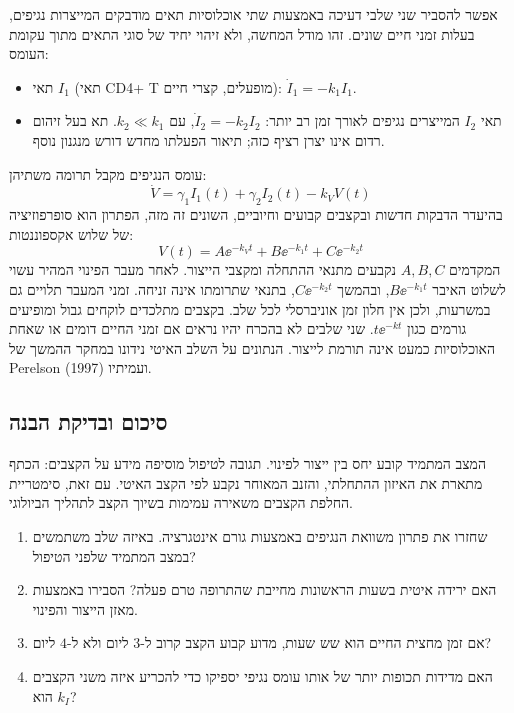 אפשר להסביר שני שלבי דעיכה באמצעות שתי אוכלוסיות תאים מודבקים המייצרות נגיפים, בעלות זמני חיים שונים. זהו מודל המחשה, ולא זיהוי יחיד של סוגי התאים מתוך עקומת העומס:
\begin{itemize}
\item תאי $I_1$ (תאי CD4+ T מופעלים, קצרי חיים): $\dot{I}_1 = -k_1 I_1$.
\item תאי $I_2$ המייצרים נגיפים לאורך זמן רב יותר: $\dot{I}_2 = -k_2 I_2$, עם $k_2 \ll k_1$. תא בעל זיהום רדום אינו יצרן רציף כזה; תיאור הפעלתו מחדש דורש מנגנון נוסף.
\end{itemize}
עומס הנגיפים מקבל תרומה משתיהן:
\begin{equation}\label{eq:biphasic-ode}
\dot{V} = \gamma_1 I_1(t) + \gamma_2 I_2(t) - k_V V(t)
\end{equation}
בהיעדר הדבקות חדשות ובקצבים קבועים וחיוביים, השונים זה מזה, הפתרון הוא סופרפוזיציה של שלוש אקספוננטות:
\begin{equation}\label{eq:biphasic-solution}
V(t) = A \ee^{-k_V t} + B \ee^{-k_1 t} + C \ee^{-k_2 t}
\end{equation}
המקדמים $A,B,C$ נקבעים מתנאי ההתחלה ומקצבי הייצור. לאחר מעבר הפינוי המהיר עשוי לשלוט האיבר $B\ee^{-k_1t}$, ובהמשך $C\ee^{-k_2t}$, בתנאי שתרומתו אינה זניחה. זמני המעבר תלויים גם במשרעות, ולכן אין חלון זמן אוניברסלי לכל שלב. בקצבים מתלכדים לוקחים גבול ומופיעים גורמים כגון $t\ee^{-kt}$. שני שלבים לא בהכרח יהיו נראים אם זמני החיים דומים או שאחת האוכלוסיות כמעט אינה תורמת לייצור. הנתונים על השלב האיטי נידונו במחקר ההמשך של Perelson ועמיתיו (1997).

\subsection*{סיכום ובדיקת הבנה}
המצב המתמיד קובע יחס בין ייצור לפינוי. תגובה לטיפול מוסיפה מידע על הקצבים: הכתף מתארת את האיזון ההתחלתי, והזנב המאוחר נקבע לפי הקצב האיטי. עם זאת, סימטריית החלפת הקצבים משאירה עמימות בשיוך הקצב לתהליך הביולוגי.
\begin{enumerate}
\item שחזרו את פתרון משוואת הנגיפים באמצעות גורם אינטגרציה. באיזה שלב משתמשים במצב המתמיד שלפני הטיפול?
\item האם ירידה איטית בשעות הראשונות מחייבת שהתרופה טרם פעלה? הסבירו באמצעות מאזן הייצור והפינוי.
\item אם זמן מחצית החיים הוא שש שעות, מדוע קבוע הקצב קרוב ל-$3$ ליום ולא ל-$4$ ליום?
\item האם מדידות תכופות יותר של אותו עומס נגיפי יספיקו כדי להכריע איזה משני הקצבים הוא $k_I$?
\end{enumerate}
